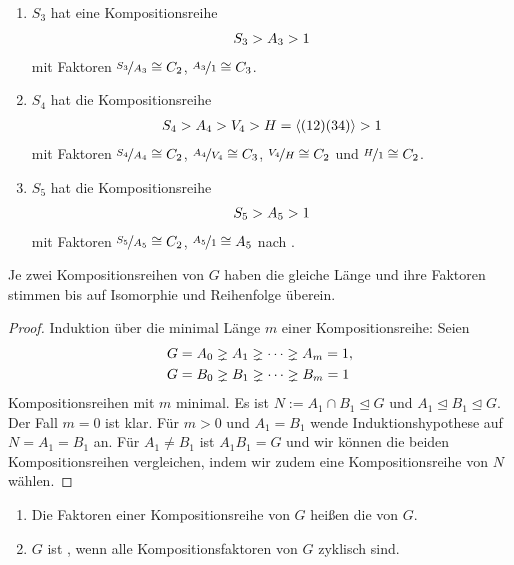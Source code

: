 \begin{example}
	\begin{enumerate}[label=(\alph*)]
		\item $S_3$ hat eine Kompositionsreihe
		\begin{align}
			S_3 > A_3 > 1 \notag %
		\end{align}
		mit Faktoren $\nicefrac{S_3}{A_3} \cong C_2$, $\nicefrac{A_3}{1} \cong C_3$.
		\item $S_4$ hat die Kompositionsreihe
		\begin{align}
			S_4 > A_4 > V_4 > H=\langle (12)(34)\rangle > 1 \notag %
		\end{align}
		mit Faktoren $\nicefrac{S_4}{A_4} \cong C_2$, $\nicefrac{A_4}{V_4} \cong C_3$, $\nicefrac{V_4}{H} \cong C_2$ und $\nicefrac{H}{1}\cong C_2$.
		\item $S_5$ hat die Kompositionsreihe
		\begin{align}
			S_5 > A_5 > 1\notag %
		\end{align}
		mit Faktoren $\nicefrac{S_5}{A_5} \cong C_2$, $\nicefrac{A_5}{1} \cong A_5$ nach .
	\end{enumerate}
\end{example}

\begin{theorem}
	Je zwei Kompositionsreihen von $G$ haben die gleiche Länge und ihre Faktoren stimmen bis auf Isomorphie und Reihenfolge überein.
\end{theorem}

\begin{proof}
	 Induktion über die minimal Länge $m$ einer Kompositionsreihe: Seien
	 \begin{align}
	 	G &= A_0 \gneq A_1 \gneq \dotsm \gneq A_m = 1,\notag \\ %
	 	G &= B_0 \gneq B_1 \gneq \dotsm \gneq B_m = 1\notag
	 \end{align}
	 Kompositionsreihen mit $m$ minimal. Es ist $N := A_1 \cap B_1 \unlhd G$ und $A_1 \unlhd B_1 \unlhd G$. Der Fall $m = 0$ ist klar. Für $m > 0$ und $A_1 = B_1$ wende Induktionshypothese auf $N = A_1 = B_1$ an.
	 Für $A_1 \neq B_1$ ist $A_1 B_1 = G$ und wir können die beiden Kompositionsreihen vergleichen, indem wir zudem eine Kompositionsreihe von $N$ wählen.
\end{proof}

\begin{definition}
	\begin{enumerate}[label=(\alph*)]
		\item Die Faktoren einer Kompositionsreihe von $G$ heißen die  von $G$.
		\item $G$ ist , wenn alle Kompositionsfaktoren von $G$ zyklisch sind.
	\end{enumerate}
\end{definition}

